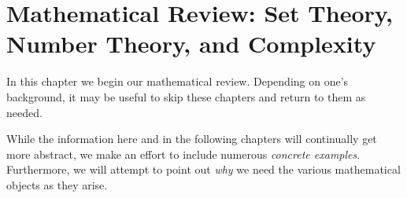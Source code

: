 \chapter{Mathematical Review: Set Theory, Number Theory, and Complexity}
\label{chap:math_1}

In this chapter we begin our mathematical review.
Depending on one's background, it may be useful to skip these
chapters and return to them as needed.

While the information here and in the following chapters will continually
get more abstract, we make an effort to include numerous
\emph{concrete examples}.
Furthermore, we will attempt to point out \emph{why} we need
the various mathematical objects as they arise.






